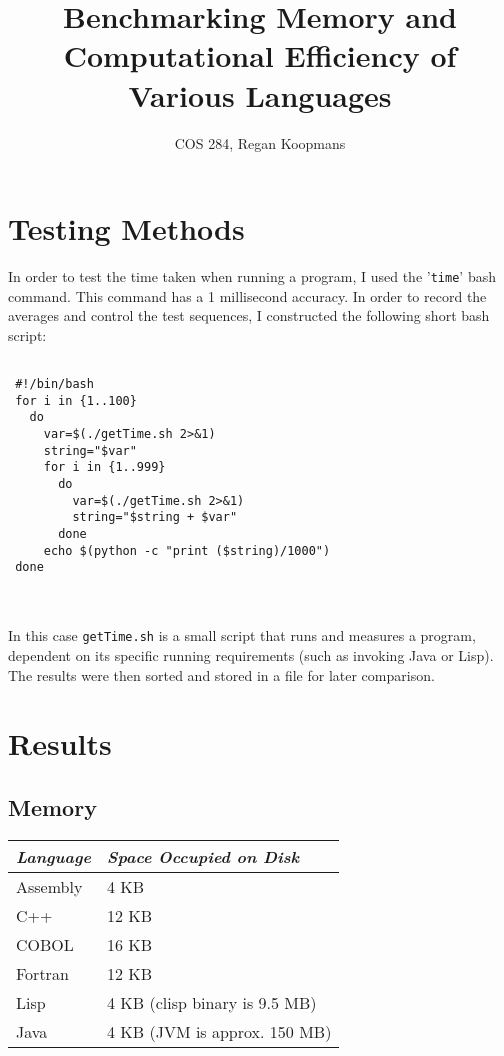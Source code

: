 \documentclass[10pt,a4paper]{article}
\title{Benchmarking Memory and Computational Efficiency of Various Languages}
\author{COS 284, Regan Koopmans}
\begin{document}
	\maketitle
	
	\section*{Testing Methods}
	
		In order to test the time taken when running a program, I used the '\texttt{time}' bash command. This command has a 1 millisecond accuracy. In order to record the averages and control the test sequences, I constructed the following short bash script:
	
	\hrulefill
	
		\begin{lstlisting}
		
 #!/bin/bash
 for i in {1..100}
   do
     var=$(./getTime.sh 2>&1)
     string="$var"
     for i in {1..999}
       do
         var=$(./getTime.sh 2>&1)
         string="$string + $var"
       done
     echo $(python -c "print ($string)/1000")
 done
		
		\end{lstlisting}

	\hrulefill
	\\
		In this case \texttt{getTime.sh} is a small script that runs and measures a program, dependent on its specific running requirements (such as invoking Java or Lisp). The results were then sorted and stored in a file for later comparison.
	
	
	
	\section*{Results}
		\subsection*{Memory}

		\begin{center}
		\bgroup
		\def\arraystretch{1.5}
			\begin{tabular}{|l|l|}
				\hline
				\textit{Language} & \textit{Space Occupied on Disk}	\\ \hline
				Assembly & 4 KB                          			\\
				C++      & 12 KB                         			\\
				COBOL    & 16 KB                         			\\
				Fortran  & 12 KB                         			\\
				Lisp     & 4 KB (clisp binary is 9.5 MB) 			\\
				Java     & 4 KB (JVM is approx. 150 MB)  			\\ \hline
			\end{tabular}
		\egroup
		\end{center}
		
\end{document}
